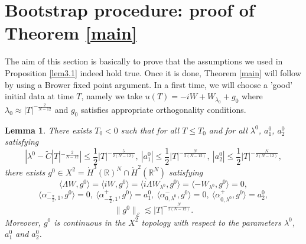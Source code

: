 \documentclass[a4paper,two-side,10pt]{amsart}
\newtheorem{prop}{Proposition}[section]
\newtheorem{lem}{Lemma}[section]
\newcommand{\R}{\mathbb{R}}
\numberwithin{equation}{section}
\begin{document}




\section{Bootstrap procedure: proof of Theorem \ref{main}}
The aim of this section is basically to prove that the assumptions we used in Proposition \ref{lem3.1} indeed hold true. Once it is done, Theorem \ref{main} will follow by using a Brower fixed point argument. In a first time, we will choose a 'good' initial data at time $T$, namely we take $u(T)=-iW +W_{\lambda_0}+g_0$ where $\lambda_0 \approx |T|^{-\frac{2}{N-12}} $ and $g_0$ satisfies appropriate orthogonality conditions. 
\begin{lem}
\label{lemcondinit}
There exists $T_0<0$ such that for all $T\leq T_0$ and for all $\lambda^0$, $a_1^0$, $a_2^0$ satisfying
\begin{equation}
\label{condinit}
|\lambda^0 - \tilde{C} |T|^{-\frac{2}{N-12}}|\leq \frac{1}{2} |T|^{-\frac{5}{2(N-12)}},\ |a_1^0|\leq \frac{1}{2} |T|^{-\frac{N}{2(N-12)}},\ |a_2^0|\leq \frac{1}{2} |T|^{-\frac{N}{2(N-12)}},
\end{equation}
there exists $g^0 \in X^2 = \dot{H}^3 (\R)^N \cap \dot{H}^2 (\R^N)$ satisfying
\begin{equation}\label{4-2}
\langle \Lambda W , g^0\rangle = \langle iW , g^0\rangle = \langle i \Lambda W_{\lambda^0},g^0 \rangle = \langle - W_{\lambda^0}, g^0\rangle =0,
\end{equation}
\begin{equation}\label{4-3}
\langle \alpha^-_{-\frac{\pi}{2},1} , g^0 \rangle =0,\ \langle \alpha^+_{-\frac{\pi}{2},1}, g^0 \rangle = a_1^0 ,\ \langle \alpha_{0,\lambda^0}^- , g^0 \rangle =0 ,\ \langle \alpha_{0,\lambda^0}^+,g^0 \rangle = a_2^0,
\end{equation}
\begin{equation}
\label{eqg0}
\|g^0\|_{\mathcal{E}} \lesssim |T|^{-\frac{N}{2(N-12)}} .
\end{equation}
Moreover, $g^0$ is continuous in the $X^2$ topology with respect to the parameters $\lambda^0$, $a_1^0$ and $a_2^0$.
\end{lem}
\end{document}
